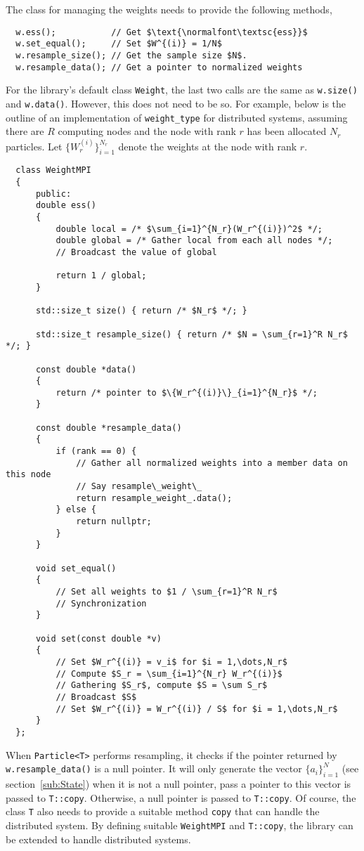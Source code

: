 The class for managing the weights needs to provide the following methods,
\begin{Verbatim}
  w.ess();           // Get $\text{\normalfont\textsc{ess}}$
  w.set_equal();     // Set $W^{(i)} = 1/N$
  w.resample_size(); // Get the sample size $N$.
  w.resample_data(); // Get a pointer to normalized weights
\end{Verbatim}
For the library's default class \verb|Weight|, the last two calls are the same
as \verb|w.size()| and \verb|w.data()|. However, this does not need to be so.
For example, below is the outline of an implementation of \verb|weight_type|
for distributed systems, assuming there are $R$ computing nodes and the node
with rank $r$ has been allocated $N_r$ particles. Let
$\{W_r^{(i)}\}_{i=1}^{N_r}$ denote the weights at the node with rank $r$.
\begin{Verbatim}
  class WeightMPI
  {
      public:
      double ess()
      {
          double local = /* $\sum_{i=1}^{N_r}(W_r^{(i)})^2$ */;
          double global = /* Gather local from each all nodes */;
          // Broadcast the value of global

          return 1 / global;
      }

      std::size_t size() { return /* $N_r$ */; }

      std::size_t resample_size() { return /* $N = \sum_{r=1}^R N_r$ */; }

      const double *data()
      {
          return /* pointer to $\{W_r^{(i)}\}_{i=1}^{N_r}$ */;
      }

      const double *resample_data()
      {
          if (rank == 0) {
              // Gather all normalized weights into a member data on this node
              // Say resample\_weight\_
              return resample_weight_.data();
          } else {
              return nullptr;
          }
      }

      void set_equal()
      {
          // Set all weights to $1 / \sum_{r=1}^R N_r$
          // Synchronization
      }

      void set(const double *v)
      {
          // Set $W_r^{(i)} = v_i$ for $i = 1,\dots,N_r$
          // Compute $S_r = \sum_{i=1}^{N_r} W_r^{(i)}$
          // Gathering $S_r$, compute $S = \sum S_r$
          // Broadcast $S$
          // Set $W_r^{(i)} = W_r^{(i)} / S$ for $i = 1,\dots,N_r$
      }
  };
\end{Verbatim}
When \verb|Particle<T>| performs resampling, it checks if the pointer returned
by \verb|w.resample_data()| is a null pointer. It will only generate the vector
$\{a_i\}_{i=1}^N$ (see section~\ref{sub:State}) when it is not a null pointer,
pass a pointer to this vector is passed to \verb|T::copy|. Otherwise, a null
pointer is passed to \verb|T::copy|. Of course, the class \verb|T| also needs
to provide a suitable method \verb|copy| that can handle the distributed
system. By defining suitable \verb|WeightMPI| and \verb|T::copy|, the library
can be extended to handle distributed systems.

